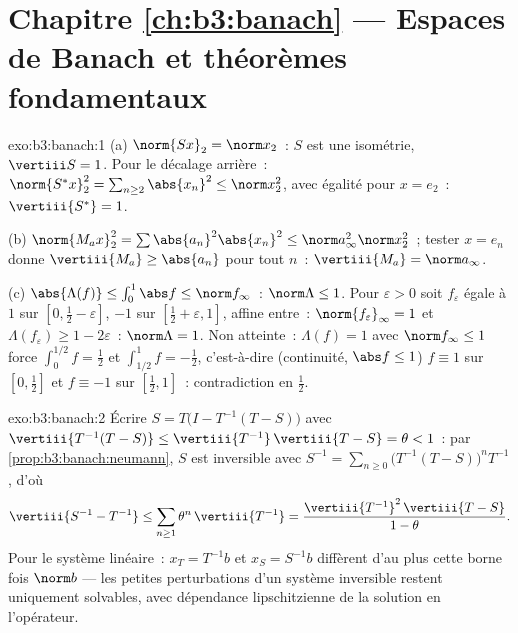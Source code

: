 \section*{Chapitre \ref{ch:b3:banach} --- Espaces de Banach et
théorèmes fondamentaux}

\begin{solution}{exo:b3:banach:1}
(a) $\norm{Sx}_2 = \norm x_2$~: $S$ est une isométrie,
$\vertiii S = 1$. Pour le décalage arrière~: $\norm{S^*x}_2^2
= \sum_{n \geq 2}\abs{x_n}^2 \leq \norm x_2^2$, avec égalité
pour $x = e_2$~: $\vertiii{S^*} = 1$.

(b) $\norm{M_ax}_2^2 = \sum\abs{a_n}^2\abs{x_n}^2 \leq \norm
a_\infty^2\norm x_2^2$~; tester $x = e_n$ donne $\vertiii{M_a}
\geq \abs{a_n}$ pour tout $n$~: $\vertiii{M_a} = \norm
a_\infty$.

(c) $\abs{\Lambda(f)} \leq \int_0^1\abs f \leq \norm
f_\infty$~: $\norm\Lambda \leq 1$. Pour $\varepsilon > 0$ soit
$f_\varepsilon$ égale à $1$ sur $[0, \frac12 - \varepsilon]$,
$-1$ sur $[\frac12 + \varepsilon, 1]$, affine entre~:
$\norm{f_\varepsilon}_\infty = 1$ et $\Lambda(f_\varepsilon)
\geq 1 - 2\varepsilon$~: $\norm\Lambda = 1$. Non atteinte~:
$\Lambda(f) = 1$ avec $\norm f_\infty \leq 1$ force
$\int_0^{1/2}f = \frac12$ et $\int_{1/2}^1 f = -\frac12$,
c'est-à-dire (continuité, $\abs f \leq 1$) $f \equiv 1$ sur
$[0, \frac12]$ et $f \equiv -1$ sur $[\frac12, 1]$~:
contradiction en $\frac12$.
\end{solution}

\begin{solution}{exo:b3:banach:2}
Écrire $S = T\bigl(I - T^{-1}(T - S)\bigr)$ avec
$\vertiii{T^{-1}(T-S)} \leq \vertiii{T^{-1}}\,\vertiii{T - S}
= \theta < 1$~: par \cref{prop:b3:banach:neumann}, $S$ est
inversible avec $S^{-1} =
\sum_{n\geq0}\bigl(T^{-1}(T-S)\bigr)^nT^{-1}$, d'où
\[
\vertiii{S^{-1} - T^{-1}} \leq
\sum_{n\geq1}\theta^n\,\vertiii{T^{-1}}
= \frac{\vertiii{T^{-1}}^2\,\vertiii{T - S}}{1 - \theta}.
\]
Pour le système linéaire~: $x_T = T^{-1}b$ et $x_S = S^{-1}b$
diffèrent d'au plus cette borne fois $\norm b$ --- les
petites perturbations d'un système inversible restent
uniquement solvables, avec dépendance lipschitzienne de la
solution en l'opérateur.
\end{solution}

